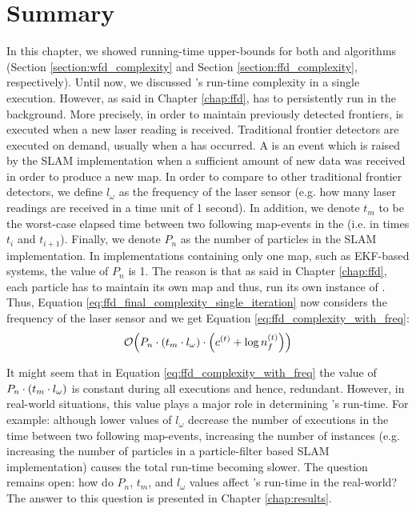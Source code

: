 \section{Summary}
In this chapter, we showed running-time upper-bounds for both \WFD and \FFD
algorithms (Section \ref{section:wfd_complexity} and Section
\ref{section:ffd_complexity}, respectively).
Until now, we discussed \FFD's run-time complexity in a single execution.
However, as said in Chapter \ref{chap:ffd}, \FFD has to persistently run in the
background. More precisely, in order to maintain previously detected frontiers,
\FFD is executed when a new laser reading is received. Traditional frontier
detectors are executed on demand, usually when a \emph{\mapevent} has occurred.
A \emph{\mapevent} is an event which is raised by the SLAM implementation
when a sufficient amount of new data was received in order to produce a new map.
In order to compare \FFD to other traditional frontier detectors, we define
$l_\omega$ as the frequency of the laser sensor (e.g. how many laser readings
are received in a time unit of 1 second). In addition, we denote $t_{m}$ to be
the worst-case elapsed time between two following map-events in the (i.e. in
times $t_i$ and $t_{i+1}$).  Finally, we denote $P_n$ as the number of particles
in the SLAM implementation. In implementations containing only one map, such as
EKF-based systems, the value of $P_n$ is 1. The reason is that as said in
Chapter \ref{chap:ffd}, each particle has to maintain its own map and thus, run
its own instance of \FFD. Thus, Equation
\eqref{eq:ffd_final_complexity_single_iteration} now considers the frequency of
the laser sensor and we get Equation \eqref{eq:ffd_complexity_with_freq}:
\begin{equation}\label{eq:ffd_complexity_with_freq}
\mathcal{O}{\left(P_n\cdot {\left(t_m \cdot l_\omega\right)} \cdot{\left(c^{\left(t\right)} +
        \log{n_f^{\left(t\right)}}\right)}\right)}
\end{equation}

It might seem that in Equation \eqref{eq:ffd_complexity_with_freq} the value of
$P_n\cdot {\left(t_m \cdot l_\omega\right)}$ is constant during all \FFD executions and
hence, redundant. However, in real-world situations, this value plays a major
role in determining \FFD's run-time. For example:
although lower values of $l_\omega$ decrease the number of \FFD executions in
the time between two following map-events, increasing the number of \FFD
instances (e.g. increasing the number of particles in a particle-filter based
SLAM implementation) causes the total run-time becoming slower. The question
remains open: how do $P_n$, $t_m$, and $l_\omega$ values affect \FFD's
run-time in the real-world?
The answer to this question is presented in Chapter \ref{chap:results}.

